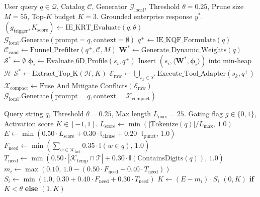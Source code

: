 \documentclass[conference,onecolumn,10pt]{IEEEtran}
\begin{document}
\begin{algorithm}[h]
\caption{End-to-End AMORA Master Execution Pipeline}
\label{alg:end_to_end}
\begin{algorithmic}[1]
\REQUIRE User query $q \in \mathcal{Q}$, Catalog $\mathcal{C}$, Generator $\mathcal{G}_{\text{local}}$, Threshold $\theta = 0.25$, Prune size $M = 55$, Top-$K$ budget $K = 3$.
\ENSURE Grounded enterprise response $y^*$.
\STATE $(g_{\text{trigger}}, K_{\text{score}}) \leftarrow \text{IE\_KRT\_Evaluate}(q, \theta)$
    \STATE {}
    \RETURN $\mathcal{G}_{\text{local}}.\text{Generate}(\text{prompt} = q, \text{context} = \emptyset)$
\ENDIF
\STATE $q^+ \leftarrow \text{IE\_KQF\_Formulate}(q)$
\STATE $\mathcal{C}_{\text{cand}} \leftarrow \text{Funnel\_Prefilter}(q^+, \mathcal{C}, M)$ 
\STATE $\mathbf{W}^* \leftarrow \text{Generate\_Dynamic\_Weights}(q)$ 
\STATE $\mathcal{S}^* \leftarrow \emptyset$
    \STATE $\boldsymbol{\phi}_i \leftarrow \text{Evaluate\_6D\_Profile}(s_i, q^+)$
    \STATE Insert $(s_i, \langle \mathbf{W}^*, \boldsymbol{\phi}_i \rangle)$ into min-heap $\mathcal{H}$
\ENDFOR
\STATE $\mathcal{S}^* \leftarrow \text{Extract\_Top\_K}(\mathcal{H}, K)$
\STATE $\mathcal{E}_{\text{raw}} \leftarrow \bigcup_{s_k \in \mathcal{S}^*} \text{Execute\_Tool\_Adapter}(s_k, q^+)$
\STATE $\mathcal{X}_{\text{compact}} \leftarrow \text{Fuse\_And\_Mitigate\_Conflicts}(\mathcal{E}_{\text{raw}})$
\RETURN $\mathcal{G}_{\text{local}}.\text{Generate}(\text{prompt} = q, \text{context} = \mathcal{X}_{\text{compact}})$
\end{algorithmic}
\end{algorithm}

\begin{algorithm}[h]
\caption{INKER Knowledge Retrieval Trigger (IE-KRT)}
\label{alg:krt}
\begin{algorithmic}[1]
\REQUIRE Query string $q$, Threshold $\theta = 0.25$, Max length $L_{\text{max}} = 25$.
\ENSURE Gating flag $g \in \{0, 1\}$, Activation score $K \in [-1, 1]$.
\STATE $L_{\text{score}} \leftarrow \min(|\text{Tokenize}(q)| / L_{\text{max}}, \, 1.0)$
\STATE $E \leftarrow \min(0.50 \cdot L_{\text{score}} + 0.30 \cdot \mathbb{I}_{\text{clause}} + 0.20 \cdot \mathbb{I}_{\text{punct}}, \, 1.0)$
\STATE $F_{\text{need}} \leftarrow \min(\sum_{w \in \mathcal{K}_{\text{fact}}} 0.35 \cdot \mathbb{I}(w \in q), \, 1.0)$
\STATE $T_{\text{need}} \leftarrow \min(0.50 \cdot |\mathcal{K}_{\text{temp}} \cap \mathcal{T}| + 0.30 \cdot \mathbb{I}(\text{ContainsDigits}(q)), \, 1.0)$
\STATE $m_i \leftarrow \max(0.10, \, 1.0 - (0.50 \cdot F_{\text{need}} + 0.40 \cdot T_{\text{need}}))$
\STATE $S_i \leftarrow \min(1.0, \, 0.30 + 0.40 \cdot F_{\text{need}} + 0.30 \cdot T_{\text{need}})$
\STATE $K \leftarrow (E - m_i) \cdot S_i$
\RETURN $(0, K)$ \textbf{if} $K < \theta$ \textbf{else} $(1, K)$
\end{algorithmic}
\end{algorithm}
\end{document}
